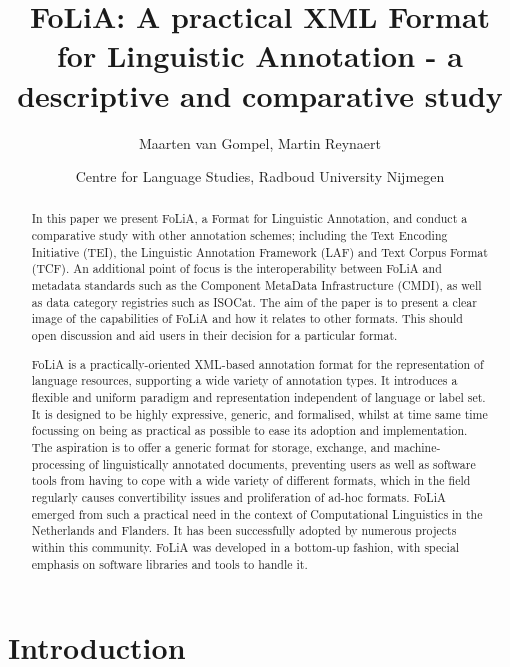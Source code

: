 \documentclass[a4paper,10pt,twoside]{article}
\title{FoLiA: A practical XML Format for Linguistic Annotation - a descriptive and comparative study}
\author{Maarten van Gompel, Martin Reynaert}
\date{Centre for Language Studies, Radboud University Nijmegen}
\begin{document}
\maketitle

\begin{abstract}

In this paper we present FoLiA, a Format for Linguistic Annotation, and conduct
a comparative study with other annotation schemes; including the
Text Encoding Initiative (TEI), the Linguistic Annotation Framework
(LAF) and Text Corpus Format (TCF). An additional point of focus is the
interoperability between FoLiA and metadata standards such as the Component
MetaData Infrastructure (CMDI), as well as data category registries such as
ISOCat. The aim of the paper is to present a clear image of the capabilities of
FoLiA and how it relates to other formats. This should open discussion and aid
users in their decision for a particular format.

FoLiA is a practically-oriented XML-based annotation format for the
representation of language resources, supporting a wide variety of annotation
types. It introduces a flexible and uniform paradigm and representation
independent of language or label set. It is designed to be highly expressive,
generic, and formalised, whilst at time same time focussing on being as
practical as possible to ease its adoption and implementation. The aspiration
is to offer a generic format for storage, exchange, and machine-processing of
linguistically annotated documents, preventing users as well as software tools
from having to cope with a wide variety of different formats, which in the
field regularly causes convertibility issues and proliferation of ad-hoc
formats. FoLiA emerged from such a practical need in the context of
Computational Linguistics in the Netherlands and Flanders. It has been
successfully adopted by numerous projects within this community. FoLiA was
developed in a bottom-up fashion, with special emphasis on software libraries
and tools to handle it.

\end{abstract}

\section{Introduction}
\end{document}
